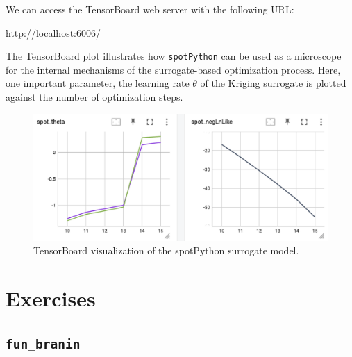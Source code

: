 \documentclass[
  letterpaper,
  DIV=11,
  numbers=noendperiod]{scrreprt}
\newenvironment{Shaded}{\begin{snugshade}}{\end{snugshade}}
\newcommand{\NormalTok}[1]{\textcolor[rgb]{0.00,0.23,0.31}{#1}}
\begin{document}
We can access the TensorBoard web server with the following URL:

\begin{Shaded}
\begin{Highlighting}[]
\NormalTok{http://localhost:6006/}
\end{Highlighting}
\end{Shaded}

The TensorBoard plot illustrates how \texttt{spotPython} can be used as
a microscope for the internal mechanisms of the surrogate-based
optimization process. Here, one important parameter, the learning rate
\(\theta\) of the Kriging surrogate is plotted against the number of
optimization steps.

\begin{figure}

{\centering \includegraphics[width=1\textwidth,height=\textheight]{figures_static/03_tensorboard_03.png}

}

\caption{TensorBoard visualization of the spotPython surrogate model.}

\end{figure}

\hypertarget{exercises-1}{%
\section{Exercises}\label{exercises-1}}

\hypertarget{fun_branin}{%
\subsection{\texorpdfstring{\texttt{fun\_branin}}{fun\_branin}}\label{fun_branin}}
\end{document}
